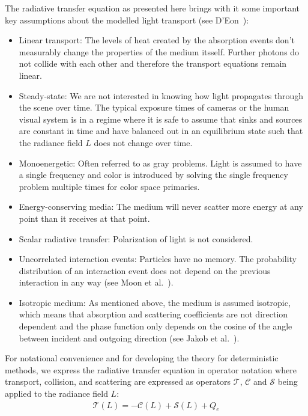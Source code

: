 The radiative transfer equation as presented here brings with it some important key assumptions about the modelled light transport (see D'Eon~\cite{DEon14}):
\begin{itemize}
\item Linear transport: The levels of heat created by the absorption events don't measurably change the properties of the medium itsself. Further photons do not collide with each other and therefore the transport equations remain linear.
\item Steady-state: We are not interested in knowing how light propagates through the scene over time. The typical exposure times of cameras or the human visual system is in a regime where it is safe to assume that sinks and sources are constant in time and have balanced out in an equilibrium state such that the radiance field $L$ does not change over time.
\item Monoenergetic: Often referred to as gray problems. Light is assumed to have a single frequency and color is introduced by solving the single frequency problem multiple times for color space primaries.
\item Energy-conserving media: The medium will never scatter more energy at any point than it receives at that point.
\item Scalar radiative transfer: Polarization of light is not considered.
\item Uncorrelated interaction events: Particles have no memory. The probability distribution of an interaction event does not depend on the previous interaction in any way (see Moon et al.~\cite{Moon07}).
\item Isotropic medium: As mentioned above, the medium is assumed isotropic, which means that absorption and scattering coefficients are not direction dependent and the phase function only depends on the cosine of the angle between incident and outgoing direction (see Jakob et al.~\cite{Jakob10}).
\end{itemize}

For notational convenience and for developing the theory for deterministic methods, we express the radiative transfer equation in operator notation where transport, collision, and scattering are expressed as operators $\mathcal{T}$, $\mathcal{C}$ and $\mathcal{S}$ being applied to the radiance field $L$:
\begin{align}
\mathcal{T}\left(L\right) = -\mathcal{C}\left(L\right) + \mathcal{S}\left(L\right) + Q_e
\end{align}

